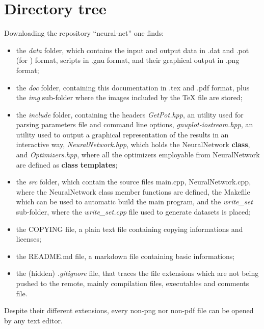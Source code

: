 \documentclass[12pt, a4paper]{report}
\theoremstyle{definition}
\begin{document}
{\section{Directory tree}
Downloading the repository ``neural-net'' one finds:
\begin{itemize}
	\item the \textit{data} folder, which contains the input and output data in .dat and .pot (for \cite{getpot}) format, \cite{gnuplot} scripts in .gnu format, and their graphical output in .png format;
	\item the \textit{doc} folder, containing this documentation in .tex and .pdf format, plus the \textit{img} sub-folder where the images included by the TeX file are stored;
	\item the \textit{include} folder, containing the headers \textit{GetPot.hpp}, an utility used for parsing parameters file and command line options, \textit{gnuplot-iostream.hpp}, an utility used to output a graphical representation of the results in an interactive way, \textit{NeuralNetwork.hpp}, which holds the NeuralNetwork \textbf{class}, and \textit{Optimizers.hpp}, where all the optimizers employable from NeuralNetwork are defined as \textbf{class templates};
	\item the \textit{src} folder, which contain the source files main.cpp, NeuralNetwork.cpp, where the NeuralNetwork class member functions are defined, the Makefile which can be used to automatic build the main program, and the \textit{write\_set} sub-folder, where the \textit{write\_set.cpp} file used to generate datasets is placed;
	\item the COPYING file, a plain text file containing copying informations and licenses;
	\item the README.md file, a markdown file containing basic informations;
	\item the (hidden) \textit{.gitignore} file, that traces the file extensions which are not being pushed to the remote, mainly compilation files, executables and comments file.
\end{itemize}
\noindent Despite their different extensions, every non-png nor non-pdf file can be opened by any text editor.
}
\end{document}

